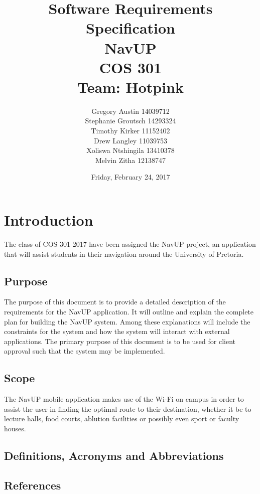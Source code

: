 \documentclass[12pt,a4paper]{report}
\title{Software Requirements Specification \\ NavUP \\ COS 301 \\ Team: Hotpink}
\date{Friday, February 24, 2017}
\author{Gregory Austin 14039712 \\ Stephanie Groutsch 14293324 \\ Timothy Kirker 11152402 \\ Drew Langley 11039753 \\ Xoliswa Ntshingila 13410378 \\ Melvin Zitha 12138747}
\begin{document}
\maketitle



\newpage
 \section*{Introduction}
The class of COS 301 2017 have been assigned the NavUP project, an application that will assist students in their navigation around the University of Pretoria.

	\subsection*{Purpose}
	The purpose of this document is to provide a detailed description of the requirements for the NavUP application. It will outline and explain the complete plan for building the NavUP system. 
	Among these explanations will include the constraints for the system and how the system will interact with external applications. The primary purpose of this document is to be used for client approval such that the system may be implemented.

		
	\subsection*{Scope}
	The NavUP mobile application makes use of the Wi-Fi on campus in order to assist the user in finding the optimal route to their destination, whether it be to lecture halls, food courts, ablution facilities or possibly even sport or faculty houses.

		
		
	\subsection*{Definitions, Acronyms and Abbreviations}
	
	\subsection*{References}
	
\end{document}
